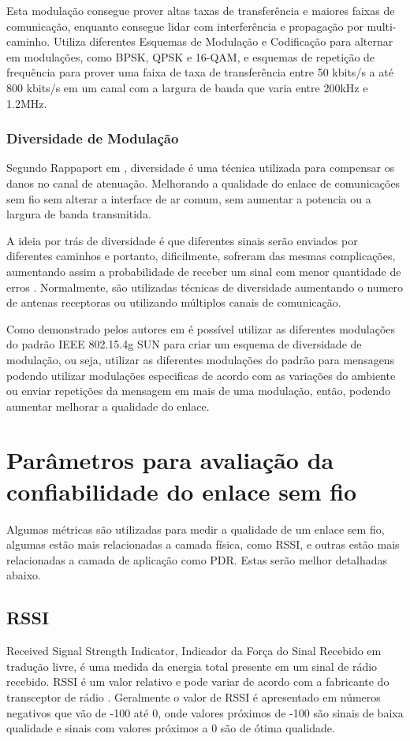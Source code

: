 Esta modulação consegue prover altas taxas de transferência e maiores faixas de comunicação, enquanto consegue lidar com interferência e propagação por multi-caminho. Utiliza diferentes Esquemas de Modulação e Codificação para alternar em modulações, como BPSK, QPSK e 16-QAM, e esquemas de repetição de frequência para prover uma faixa de taxa de transferência entre 50 kbits/s a até 800 kbits/s em um canal com a largura de banda que varia entre 200kHz e 1.2MHz.

\subsubsection*{Diversidade de Modulação}
Segundo Rappaport em \cite{rappaport2009}, diversidade é uma técnica utilizada para compensar os danos no canal de atenuação. Melhorando  a qualidade do enlace de comunicações sem fio sem alterar a interface de ar comum, sem aumentar a potencia ou a largura de banda transmitida.

A ideia por trás de diversidade é que diferentes sinais serão enviados por diferentes caminhos e portanto, dificilmente, sofreram das mesmas complicações, aumentando assim a probabilidade de receber um sinal com menor quantidade de erros \cite{goldsmith2005wireless}. Normalmente, são utilizadas técnicas de diversidade aumentando o numero de antenas receptoras ou utilizando múltiplos canais de comunicação.

Como demonstrado pelos autores em \cite{gomes2020improving} é possível utilizar as diferentes modulações do padrão IEEE 802.15.4g SUN para criar um esquema de diversidade de modulação, ou seja, utilizar as diferentes modulações do padrão para mensagens podendo utilizar modulações especificas de acordo com as variações do ambiente ou enviar repetições da mensagem em mais de uma modulação, então, podendo aumentar melhorar a qualidade do enlace.

\section{Parâmetros para avaliação da confiabilidade do enlace sem fio}
\label{paramSF}
Algumas métricas são utilizadas para medir a qualidade de um enlace sem fio, algumas estão mais relacionadas a camada física, como RSSI, e outras estão mais relacionadas a camada de aplicação como PDR. Estas serão melhor detalhadas abaixo.
\subsection*{RSSI}
Received Signal Strength Indicator, Indicador da Força do Sinal Recebido em tradução livre, é uma medida da energia total presente em um sinal de rádio recebido. RSSI é um valor relativo e pode variar de acordo com a fabricante do transceptor de rádio \cite{UNDERSTANDING_RSSI}. Geralmente o valor de RSSI é apresentado em números negativos que vão de -100 até 0, onde valores próximos de -100 são sinais de baixa qualidade e sinais com valores próximos a 0 são de ótima qualidade.

